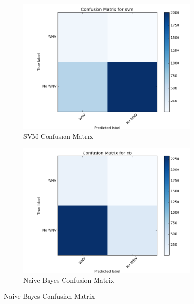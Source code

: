 \documentclass{article} %
\begin{document}
\begin{figure}
\centering
\begin{subfigure}[b]{.45\linewidth}
\includegraphics[width=\linewidth]{"img/svm-confusion"}
\caption{SVM Confusion Matrix}
\end{subfigure}
\begin{subfigure}[b]{.45\linewidth}
\includegraphics[width=\linewidth]{"img/nb-confusion"}
\caption{Naive Bayes Confusion Matrix}
\end{subfigure}


\end{figure}
\end{document}
